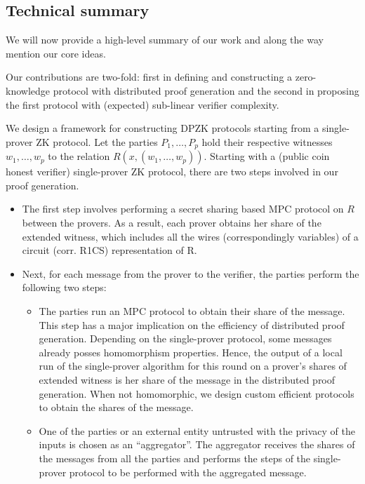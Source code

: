\subsection*{Technical summary}
We will now provide a high-level summary of our work and along the way mention our core ideas.

Our contributions are two-fold: first in defining and constructing a zero-knowledge protocol with distributed proof generation and the second in proposing the first protocol with (expected) sub-linear verifier complexity.

We design a framework for constructing DPZK protocols starting from a single-prover ZK protocol.
Let the parties $P_1, \ldots, P_p$ hold their respective witnesses $w_1, \ldots, w_p$ to the relation $R(x, (w_1, \ldots,w_p))$. 
Starting with a (public coin honest verifier) single-prover ZK protocol, there are two steps involved in our proof generation.
\begin{itemize}
\item The first step involves performing a secret sharing based MPC protocol on $R$ between the provers. As a result, each prover obtains her share of the extended witness, which includes all the wires (correspondingly variables) of a circuit (corr. R1CS) representation of R. 
\item Next, for each message from the prover to the verifier, the parties perform the following two steps:
\begin{itemize}
\item The parties run an MPC protocol to obtain their share of the message. This step has a major implication on the efficiency of distributed proof generation. Depending on the single-prover protocol, some messages already posses homomorphism properties. Hence, the output of a local run of the single-prover algorithm for this round on a prover's shares of extended witness is her share of the message in the distributed proof generation. When not homomorphic, we design custom efficient protocols to obtain the shares of the message.
\item One of the parties or an external entity untrusted with the privacy of the inputs is chosen as an ``aggregator''. The aggregator receives the shares of the messages from all the parties and performs the steps of the single-prover protocol to be performed with the aggregated message.
\end{itemize}
\end{itemize}


